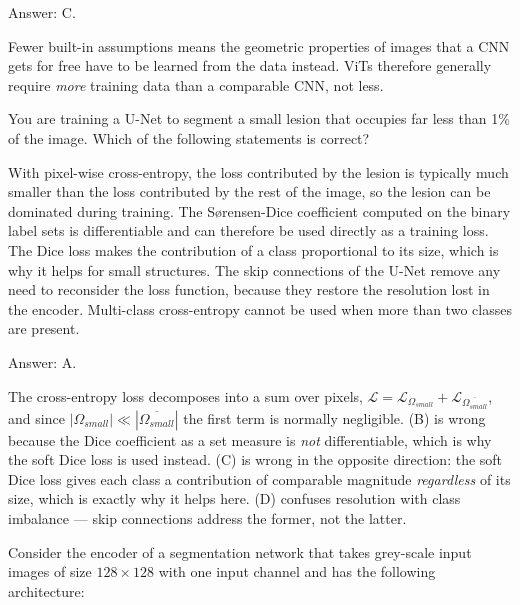 \documentclass[11pt]{exam}
\begin{document}
\begin{questions}
\begin{solution}
  Answer: C.

  Fewer built-in assumptions means the geometric properties of images that a CNN gets for free
  have to be learned from the data instead. ViTs therefore generally require \emph{more} training
  data than a comparable CNN, not less.
\end{solution}

\question
You are training a U-Net to segment a small lesion that occupies far less than 1\% of the image.
Which of the following statements is correct?

\begin{choices}
  \choice With pixel-wise cross-entropy, the loss contributed by the lesion is typically much
  smaller than the loss contributed by the rest of the image, so the lesion can be dominated
  during training.
  \choice The S\o{}rensen-Dice coefficient computed on the binary label sets is differentiable
  and can therefore be used directly as a training loss.
  \choice The Dice loss makes the contribution of a class proportional to its size, which is why
  it helps for small structures.
  \choice The skip connections of the U-Net remove any need to reconsider the loss function,
  because they restore the resolution lost in the encoder.
  \choice Multi-class cross-entropy cannot be used when more than two classes are present.
\end{choices}

\begin{solution}
  Answer: A.

  The cross-entropy loss decomposes into a sum over pixels,
  $\mathcal{L} = \mathcal{L}_{\Omega_{small}} + \mathcal{L}_{\overline{\Omega_{small}}}$, and
  since $|\Omega_{small}| \ll |\overline{\Omega_{small}}|$ the first term is normally negligible.
  (B) is wrong because the Dice coefficient as a set measure is \emph{not} differentiable, which
  is why the soft Dice loss is used instead. (C) is wrong in the opposite direction: the soft Dice
  loss gives each class a contribution of comparable magnitude \emph{regardless} of its size,
  which is exactly why it helps here. (D) confuses resolution with class imbalance --- skip
  connections address the former, not the latter.
\end{solution}

\question
Consider the encoder of a segmentation network that takes grey-scale input images of size
$128 \times 128$ with one input channel and has the following architecture:


\end{questions}
\end{document}
